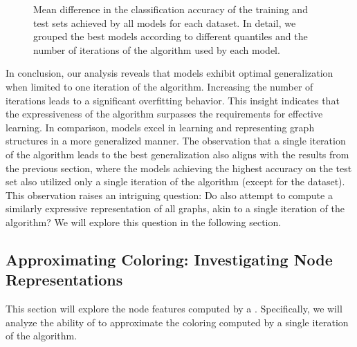 \begin{figure}[!htb]
\begin{subfigure}[b]{0.3\textwidth}
		\vspace*{-4ex} 
	\end{subfigure}
	\caption{Mean difference in the classification accuracy of the training and test sets achieved by all \wlnn models for each dataset. In detail, we grouped the best models according to different quantiles and the number of iterations of the \wl algorithm used by each model.}
	\label{fig:performance_diff_wlnn}
\end{figure}

In conclusion, our analysis reveals that \wlnn models exhibit optimal generalization when limited to one iteration of the \wl algorithm. Increasing the number of iterations leads to a significant overfitting behavior. This insight indicates that the expressiveness of the \wl algorithm surpasses the requirements for effective learning. In comparison, \gnn models excel in learning and representing graph structures in a more generalized manner. The observation that a single iteration of the \wl algorithm leads to the best generalization also aligns with the results from the previous section, where the models achieving the highest accuracy on the test set also utilized only a single iteration of the \wl algorithm (except for the \nci dataset). This observation raises an intriguing question: Do \gnns also attempt to compute a similarly expressive representation of all graphs, akin to a single iteration of the \wl algorithm? We will explore this question in the following section.

\FloatBarrier
\subsection{Approximating \wl Coloring: Investigating \gnn Node Representations}
This section will explore the node features computed by a \gnn. Specifically, we will analyze the ability of \gnns to approximate the coloring computed by a single iteration of the \wl algorithm.


